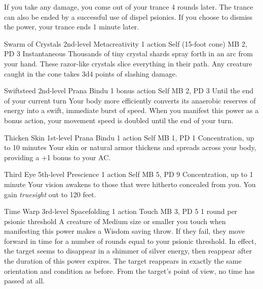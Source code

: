   If you take any damage,
  you come out of your trance 4 rounds later.
  The trance can also be ended by a
  successful use of dispel psionics.
  If you choose to dismiss the power,
  your trance ends 1 minute later.

\DndPowerHeader%
  {Swarm of Crystals}
  {2nd-level Metacreativity}
  {1 action}
  {Self (15-foot cone)}
  {MB 2, PD 3}
  {Instantaneous}
  Thousands of tiny crystal shards spray forth in an arc from your hand.
  These razor-like crystals slice everything in their path.
  Any creature caught in the cone takes 3d4 points of slashing damage.

\DndPowerHeader%
  {Swiftsteed}
  {2nd-level Prana Bindu}
  {1 bonus action}
  {Self}
  {MB 2, PD 3}
  {Until the end of your current turn}
  Your body more efficiently converts its anaerobic
  reserves of energy into a swift, immediate burst of speed.
  When you manifest this power as a bonus action,
  your movement speed is doubled until the end
  of your turn.

\DndPowerHeader%
  {Thicken Skin}
  {1st-level Prana Bindu}
  {1 action}
  {Self}
  {MB 1, PD 1}
  {Concentration, up to 10 minutes}
  Your skin or natural armor thickens
  and spreads across your body,
  providing a +1 bonus to your AC.

\DndPowerHeader%
  {Third Eye}
  {5th-level Prescience}
  {1 action}
  {Self}
  {MB 5, PD 9}
  {Concentration, up to 1 minute}
Your vision awakens to those that were hitherto
concealed from you.
You gain \emph{truesight} out to 120 feet.

\DndPowerHeader%
  {Time Warp}
  {3rd-level Spacefolding}
  {1 action}
  {Touch}
  {MB 3, PD 5}
  {1 round per psionic threshold}
  A creature of Medium size or smaller
  you touch when manifesting this power makes a Wisdom saving throw.
  If they fail, they move forward in time for a number of rounds
  equal to your psionic threshold.
  In effect, the target seems to disappear in a shimmer
  of silver energy,
  then reappear after the duration of this power expires.
  The target reappears in exactly the same
  orientation and condition as before.
  From the target's point of view,
  no time has passed at all.

